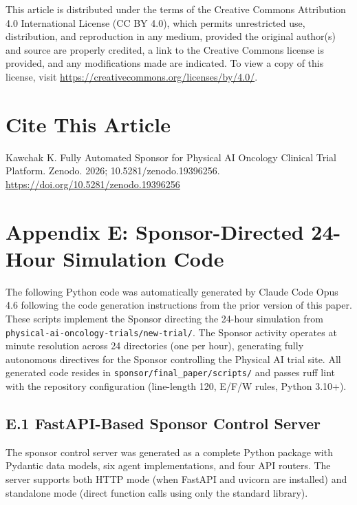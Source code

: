 This article is distributed under the terms of the Creative Commons Attribution 4.0
International License (CC BY 4.0), which permits unrestricted use, distribution, and
reproduction in any medium, provided the original author(s) and source are properly
credited, a link to the Creative Commons license is provided, and any modifications made
are indicated. To view a copy of this license, visit
\url{https://creativecommons.org/licenses/by/4.0/}.

\section*{Cite This Article}

Kawchak K. Fully Automated Sponsor for Physical AI Oncology Clinical Trial Platform.
Zenodo. 2026; 10.5281/zenodo.19396256.
\url{https://doi.org/10.5281/zenodo.19396256}

\newpage
\section*{Appendix E: Sponsor-Directed 24-Hour Simulation Code}

The following Python code was automatically generated by Claude Code Opus 4.6
following the code generation instructions from the prior version of this paper.
These scripts implement the Sponsor directing the 24-hour simulation from
\texttt{physical-ai-oncology-trials/new-trial/}. The Sponsor activity operates
at minute resolution across 24 directories (one per hour), generating fully
autonomous directives for the Sponsor controlling the Physical AI trial site.
All generated code resides in
\texttt{sponsor/final\_paper/scripts/} and passes ruff lint with the repository
configuration (line-length 120, E/F/W rules, Python 3.10+).

\subsection*{E.1 FastAPI-Based Sponsor Control Server}

The sponsor control server was generated as a complete Python package with
Pydantic data models, six agent implementations, and four API routers. The
server supports both HTTP mode (when FastAPI and uvicorn are installed) and
standalone mode (direct function calls using only the standard library).

